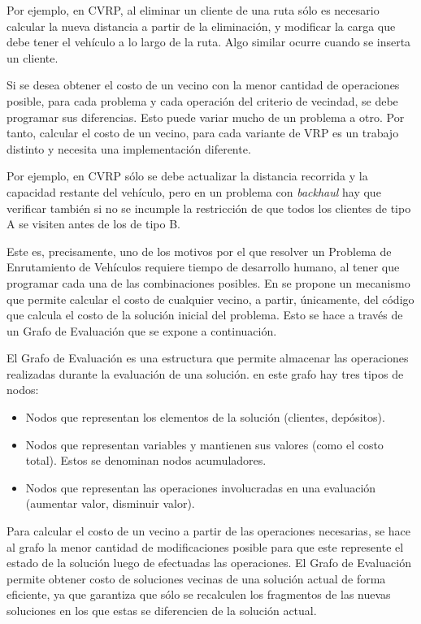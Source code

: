 Por ejemplo, en CVRP, al eliminar un cliente de una ruta sólo es necesario calcular la nueva distancia a partir de la eliminación, y modificar la carga que debe tener el vehículo a lo largo de la ruta. Algo similar ocurre cuando se inserta un cliente.

Si se desea obtener el costo de un vecino con la menor cantidad de operaciones posible, para cada problema y cada operación del criterio de vecindad, se debe programar sus diferencias. Esto puede variar mucho de un problema a otro. Por tanto, calcular el costo de un vecino, para cada variante de VRP es un trabajo distinto y necesita una implementación diferente.

Por ejemplo, en CVRP sólo se debe actualizar la distancia recorrida y la capacidad restante del vehículo, pero en un problema con \textit{backhaul} hay que verificar también si no se incumple la restricción de que todos los clientes de tipo A se visiten antes de los de tipo B.  

Este es, precisamente, uno de los motivos por el que resolver un Problema de Enrutamiento de Vehículos requiere tiempo de desarrollo humano, al tener que programar cada una de las combinaciones posibles. En \cite{JJ} se propone un mecanismo que permite calcular el costo de cualquier vecino, a partir, únicamente, del código que calcula el costo de la solución inicial del problema. Esto se hace a través de un Grafo de Evaluación que se expone a continuación.

El Grafo de Evaluación es una estructura que permite almacenar las operaciones realizadas durante la evaluación de una solución. en este grafo hay tres tipos de nodos:

\begin{itemize}
	\item Nodos que representan los elementos de la solución (clientes, depósitos).
	\item Nodos que representan variables y mantienen sus valores (como el costo total). Estos se denominan nodos acumuladores.
	\item Nodos que representan las operaciones involucradas en una evaluación (aumentar valor, disminuir valor).
\end{itemize}

Para calcular el costo de un vecino a partir de las operaciones necesarias, se hace al grafo la menor cantidad de modificaciones posible para que este represente el estado de la solución luego de efectuadas las operaciones. El Grafo de Evaluación permite obtener costo de soluciones vecinas de una solución actual de forma eficiente, ya que garantiza que sólo se recalculen los fragmentos de las nuevas soluciones en los que estas se diferencien de la solución actual.

